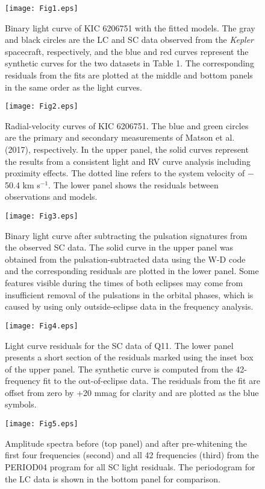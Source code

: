 \documentclass[useAMS,usenatbib,usegraphicx]{mn2e}
\begin{document}
\clearpage
\begin{figure}
\texttt{[image: Fig1.eps]}
\caption{Binary light curve of KIC 6206751 with the fitted models. The gray and black circles are the LC and SC data 
observed from the {\it Kepler} spacecraft, respectively, and the blue and red curves represent the synthetic curves for 
the two datasets in Table 1. The corresponding residuals from the fits are plotted at the middle and bottom panels in 
the same order as the light curves. }
\label{Fig1}
\end{figure}

\begin{figure}
\texttt{[image: Fig2.eps]}
\caption{Radial-velocity curves of KIC 6206751. The blue and green circles are the primary and secondary measurements of 
Matson et al. (2017), respectively. In the upper panel, the solid curves represent the results from a consistent light and 
RV curve analysis including proximity effects. The dotted line refers to the system velocity of $-$50.4 km s$^{-1}$. 
The lower panel shows the residuals between observations and models. }
\label{Fig2}
\end{figure}

\begin{figure}
\texttt{[image: Fig3.eps]}
\caption{Binary light curve after subtracting the pulsation signatures from the observed SC data. The solid curve in 
the upper panel was obtained from the pulsation-subtracted data using the W-D code and the corresponding residuals are 
plotted in the lower panel. Some features visible during the times of both eclipses may come from insufficient removal of 
the pulsations in the orbital phases, which is caused by using only outside-eclipse data in the frequency analysis. }
\label{Fig3}
\end{figure}

\begin{figure}
\texttt{[image: Fig4.eps]}
\caption{Light curve residuals for the SC data of Q11. The lower panel presents a short section of the residuals marked 
using the inset box of the upper panel. The synthetic curve is computed from the 42-frequency fit to the out-of-eclipse 
data. The residuals from the fit are offset from zero by +20 mmag for clarity and are plotted as the blue symbols. }
\label{Fig4}
\end{figure}

\begin{figure}
\texttt{[image: Fig5.eps]}
\caption{Amplitude spectra before (top panel) and after pre-whitening the first four frequencies (second) and all 42 
frequencies (third) from the PERIOD04 program for all SC light residuals. The periodogram for the LC data is shown in 
the bottom panel for comparison. }
\label{Fig5}
\end{figure}
\end{document}
